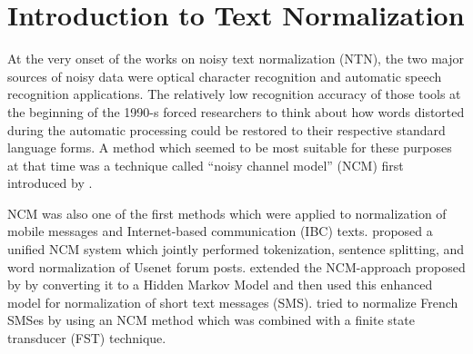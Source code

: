\section{Introduction to Text Normalization}

At the very onset of the works on noisy text normalization (NTN), the
two major sources of noisy data were optical character recognition and
automatic speech recognition applications. The relatively low
recognition accuracy of those tools at the beginning of the 1990-s
forced researchers to think about how words distorted during the
automatic processing could be restored to their respective standard
language forms. A method which seemed to be most suitable for these
purposes at that time was a technique called ``noisy channel model''
(NCM) first introduced by \citet{shannon}.


NCM was also one of the first methods which were applied to
normalization of mobile messages and Internet-based communication
(IBC) texts.  \citet{Clark:11} proposed a unified NCM system which
jointly performed tokenization, sentence splitting, and word
normalization of Usenet forum posts.  \citet{Choudhury:07} extended
the NCM-approach proposed by \citet{toutanova} by converting it to a
Hidden Markov Model and then used this enhanced model for
normalization of short text messages (SMS).  \citet{Beaufort:10} tried
to normalize French SMSes by using an NCM method which was combined
with a finite state transducer (FST) technique.

